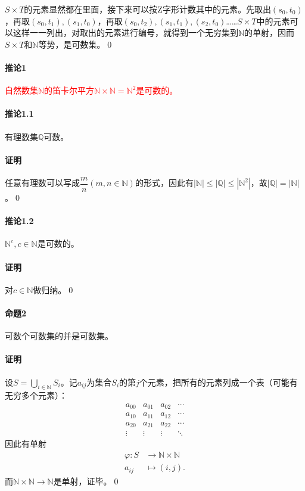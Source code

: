 \documentclass[b5paper,oneside]{ctexbook}
\newcommand{\Red}[1]{\textcolor[named]{red}{#1}}
\begin{document}
$S \times T$的元素显然都在里面，接下来可以按Z字形计数其中的元素。先取出$\left({s_0, t_0}\right)$，再取$\left({s_0, t_1}\right), \left({s_1, t_0}\right)$，再取$\left({s_0, t_2}\right), \left({s_1, t_1}\right), \left({s_2, t_0}\right)$……$S \times T$中的元素可以这样一一列出，对取出的元素进行编号，就得到一个无穷集到$\mathbb{N}$的单射，因而$S\times T$和$\mathbb{N}$等势，是可数集。\hfill\qed
\paragraph{推论1}\Red{自然数集$\mathbb{N}$的笛卡尔平方$\mathbb{N}\times\mathbb{N}=\mathbb{N}^2$是可数的。}
\paragraph{推论1.1}有理数集$\mathbb{Q}$可数。
\paragraph{证明}任意有理数可以写成$\dfrac mn (m,n\in\mathbb{N})$的形式，因此有$|\mathbb{N}|\leq |\mathbb{Q}|\leq |\mathbb{N}^2|$，故$|\mathbb{Q}|=|\mathbb{N}|$。\hfill\qed
\paragraph{推论1.2}$\mathbb{N}^c,c\in\mathbb{N}$是可数的。
\paragraph{证明}对$c\in\mathbb{N}$做归纳。\hfill\qed

\paragraph{命题2}可数个可数集的并是可数集。
\paragraph{证明}设$\displaystyle S = \bigcup_{i \in \mathbb{N}} {S_i}$。记$a_{ij}$为集合$S_i$的第$j$个元素，把所有的元素列成一个表（可能有无穷多个元素）：
\[\begin{matrix}
 {a_{00}} & {a_{01}} & {a_{02}} & \cdots \\
 {a_{10}} & {a_{11}} & {a_{12}} & \cdots \\
 {a_{20}} & {a_{21}} & {a_{22}} & \cdots \\
 \vdots  & \vdots  & \vdots & \ddots 
\end{matrix}\]
因此有单射\begin{align*}
\varphi: S &\to \mathbb{N} \times \mathbb{N}\\a_{ij} &\mapsto \left({i, j}\right).
\end{align*}
而$\mathbb{N}\times \mathbb{N}\to\mathbb{N}$是单射，证毕。\hfill\qed
\end{document}
